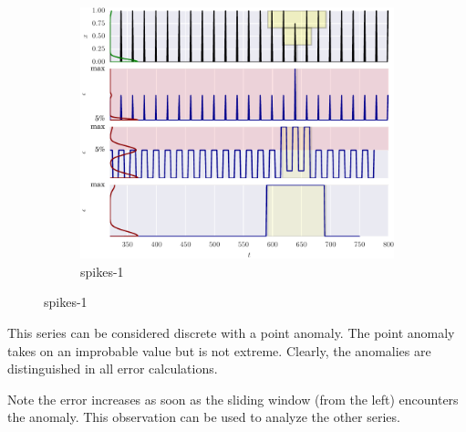  \nopagebreak

\begin{figure}[H]
    \centering
  
  \begin{subfigure}[t]{\textwidth}
        \centering
        \includegraphics[]{figs/er_spikelv.pdf}
        \caption{spikes-1}
    \end{subfigure}%

\end{figure}

This series can be considered discrete with a point anomaly.
%
The point anomaly takes on an improbable value but is not extreme.
%
Clearly, the anomalies are distinguished in all error calculations.

Note the error increases as soon as the sliding window (from the left) encounters the anomaly.
%
This observation can be used to analyze the other series.



 \nopagebreak

